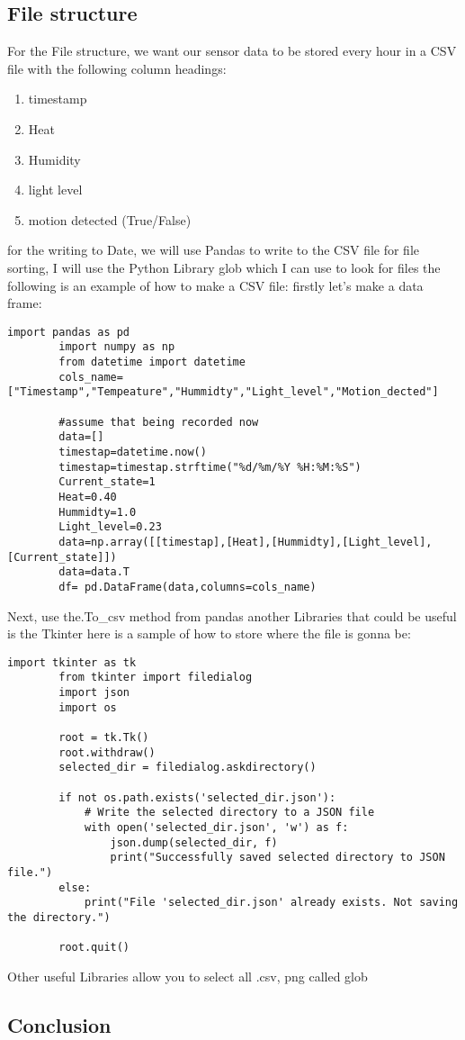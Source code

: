 	\subsection{File structure}
	For the  File structure, we want our sensor data to be stored every hour in a  CSV file with the following column headings:
	\begin{enumerate}
		\item timestamp
		\item Heat
		\item Humidity
		\item light level
		\item motion detected (True/False)
	\end{enumerate}
	for the writing to Date, we will use Pandas to write to the CSV file
	for file sorting, I will use the Python Library glob  which I can use  to look for  files 
	the following is an example of how  to  make a CSV file:
	firstly let's make a data frame:
	\begin{lstlisting}[style=mystyle,caption={sample code for turning sensor data into a data}]
		import pandas as pd
		import numpy as np
		from datetime import datetime
		cols_name=["Timestamp","Tempeature","Hummidty","Light_level","Motion_dected"]

		#assume that being recorded now
		data=[]
		timestap=datetime.now()
		timestap=timestap.strftime("%d/%m/%Y %H:%M:%S")
		Current_state=1
		Heat=0.40
		Hummidty=1.0
		Light_level=0.23
		data=np.array([[timestap],[Heat],[Hummidty],[Light_level],[Current_state]])
		data=data.T
		df= pd.DataFrame(data,columns=cols_name)
	\end{lstlisting}
	Next, use the.To\_csv method from  pandas
	another Libraries that could  be useful is the Tkinter
	here is a  sample of how to   store where the  file is  gonna be:
	\begin{lstlisting}[style=mystyle,caption={example code for storing directory}]
		import tkinter as tk
		from tkinter import filedialog
		import json
		import os

		root = tk.Tk()
		root.withdraw()
		selected_dir = filedialog.askdirectory()

		if not os.path.exists('selected_dir.json'):
			# Write the selected directory to a JSON file
			with open('selected_dir.json', 'w') as f:
				json.dump(selected_dir, f)
				print("Successfully saved selected directory to JSON file.")
		else:
			print("File 'selected_dir.json' already exists. Not saving the directory.")

		root.quit()
	\end{lstlisting}
	Other useful Libraries allow you to  select all  .csv, png  called glob
	\subsection{Conclusion}